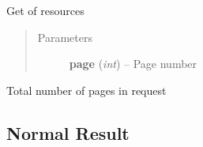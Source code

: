 \documentclass[letterpaper,10pt,english]{sphinxmanual}
\begin{document}
\begin{fulllineitems}
\begin{enumerate}
\end{enumerate}

\begin{fulllineitems}
\label{result:pygithub3.core.result.smart.Result.get_page}
Get  of resources
\begin{quote}\begin{description}
\item[{Parameters}] \leavevmode
\textbf{page} (\emph{int}) -- Page number

\end{description}\end{quote}

\end{fulllineitems}


\begin{fulllineitems}
\label{result:pygithub3.core.result.smart.Result.pages}
Total number of pages in request

\end{fulllineitems}


\end{fulllineitems}



\subsection{Normal Result}
\label{result:normal-result}
\end{document}
